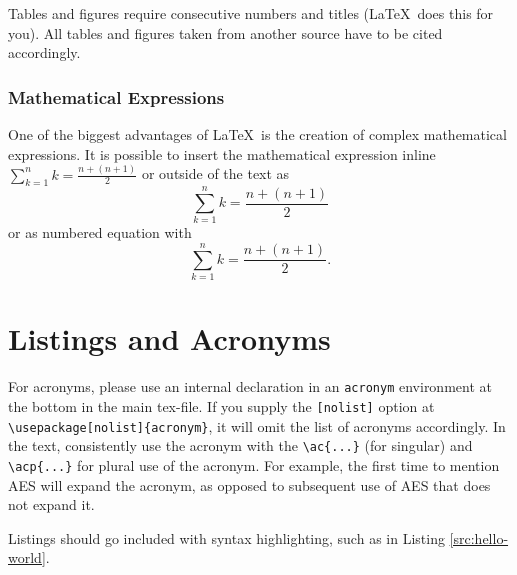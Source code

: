 \documentclass[11pt,a4paper]{article} %
\let\stdsection\section
\renewcommand\section{\clearpage\newpage\stdsection}
\begin{document}
Tables and figures require consecutive numbers and titles (\LaTeX~does this for you). All tables and figures taken from another source have to be cited accordingly.

\subsubsection{Mathematical Expressions}
One of the biggest advantages of \LaTeX\ is the creation of complex mathematical expressions. It is possible to insert the mathematical expression inline $\sum_{k=1}^{n} {k} = \frac{n+(n+1)}{2}$ or outside of the text as \[ \sum_{k=1}^{n} {k} = \frac{n+(n+1)}{2} \] or as numbered equation with
\begin{equation}
\sum_{k=1}^{n} {k} = \frac{n+(n+1)}{2}.
\end{equation}

\section{Listings and Acronyms}
For acronyms, please use an internal declaration in an \texttt{acronym} environment at the bottom in the main tex-file. If you supply the \texttt{[nolist]} option at \verb|\usepackage[nolist]{acronym}|, it will omit the list of acronyms accordingly. In the text, consistently use the acronym with the \verb|\ac{...}| (for singular) and \verb|\acp{...}| for plural use of the acronym. For example, the first time to mention \ac{AES} will expand the acronym, as opposed to subsequent use of \ac{AES} that does not expand it.

Listings should go included with syntax highlighting, such as in Listing \ref{src:hello-world}.


\end{document}
